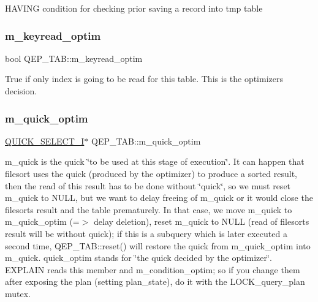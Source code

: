 H\+A\+V\+I\+NG condition for checking prior saving a record into tmp table \mbox{\label{classQEP__TAB_a977193c0d8769cd161379871d5b138a1}} 
\subsubsection{\texorpdfstring{m\+\_\+keyread\+\_\+optim}{m\_keyread\_optim}}
{\footnotesize\ttfamily bool Q\+E\+P\+\_\+\+T\+A\+B\+::m\+\_\+keyread\+\_\+optim}

True if only index is going to be read for this table. This is the optimizer\textquotesingle{}s decision. \mbox{\label{classQEP__TAB_a8bb3c3a8392cc5ec76f23e7bac67347d}} 
\subsubsection{\texorpdfstring{m\+\_\+quick\+\_\+optim}{m\_quick\_optim}}
{\footnotesize\ttfamily \mbox{\hyperlink{classQUICK__SELECT__I}{Q\+U\+I\+C\+K\+\_\+\+S\+E\+L\+E\+C\+T\+\_\+I}}$\ast$ Q\+E\+P\+\_\+\+T\+A\+B\+::m\+\_\+quick\+\_\+optim}

m\+\_\+quick is the quick \char`\"{}to be used at this stage of execution\char`\"{}. It can happen that filesort uses the quick (produced by the optimizer) to produce a sorted result, then the read of this result has to be done without \char`\"{}quick\char`\"{}, so we must reset m\+\_\+quick to N\+U\+LL, but we want to delay freeing of m\+\_\+quick or it would close the filesort\textquotesingle{}s result and the table prematurely. In that case, we move m\+\_\+quick to m\+\_\+quick\+\_\+optim (=$>$ delay deletion), reset m\+\_\+quick to N\+U\+LL (read of filesort\textquotesingle{}s result will be without quick); if this is a subquery which is later executed a second time, Q\+E\+P\+\_\+\+T\+A\+B\+::reset() will restore the quick from m\+\_\+quick\+\_\+optim into m\+\_\+quick. quick\+\_\+optim stands for \char`\"{}the quick decided by the optimizer\char`\"{}. E\+X\+P\+L\+A\+IN reads this member and m\+\_\+condition\+\_\+optim; so if you change them after exposing the plan (setting plan\+\_\+state), do it with the L\+O\+C\+K\+\_\+query\+\_\+plan mutex. \mbox{\label{classQEP__TAB_a4e9b5678ae69e56ca170ac87d035d309}} 
